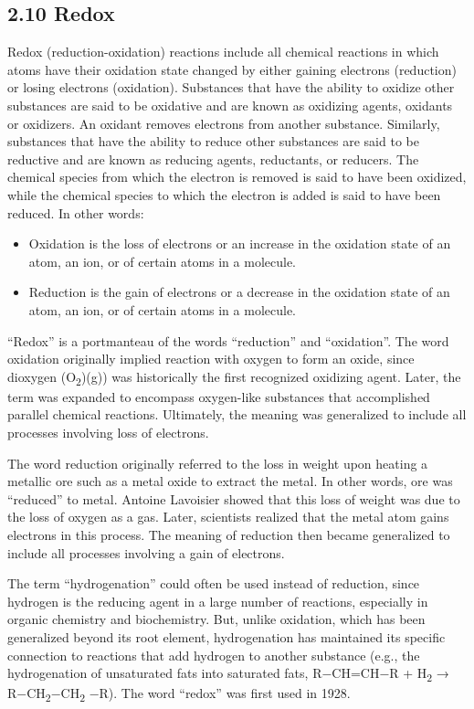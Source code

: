 \documentclass[
]{article}
\providecommand{\tightlist}{%
  \setlength{\itemsep}{0pt}\setlength{\parskip}{0pt}}
\providecommand{\tightlist}{%
  \setlength{\itemsep}{0pt}\setlength{\parskip}{0pt}}
\theoremstyle{definition}
\theoremstyle{definition}
\theoremstyle{definition}
\theoremstyle{remark}
\begin{document}
\hypertarget{redox}{%
\subsection{\texorpdfstring{{2.10} Redox}{2.10 Redox}}\label{redox}}

Redox (reduction-oxidation) reactions include all chemical reactions in
which atoms have their oxidation state changed by either gaining
electrons (reduction) or losing electrons (oxidation). Substances that
have the ability to oxidize other substances are said to be oxidative
and are known as oxidizing agents, oxidants or oxidizers. An oxidant
removes electrons from another substance. Similarly, substances that
have the ability to reduce other substances are said to be reductive and
are known as reducing agents, reductants, or reducers. The chemical
species from which the electron is removed is said to have been
oxidized, while the chemical species to which the electron is added is
said to have been reduced. In other words:

\begin{itemize}
\tightlist
\item
  Oxidation is the loss of electrons or an increase in the oxidation
  state of an atom, an ion, or of certain atoms in a molecule.
\item
  Reduction is the gain of electrons or a decrease in the oxidation
  state of an atom, an ion, or of certain atoms in a molecule.
\end{itemize}

``Redox'' is a portmanteau of the words ``reduction'' and ``oxidation''.
The word oxidation originally implied reaction with oxygen to form an
oxide, since dioxygen (O\textsubscript{2})(g)) was historically the
first recognized oxidizing agent. Later, the term was expanded to
encompass oxygen-like substances that accomplished parallel chemical
reactions. Ultimately, the meaning was generalized to include all
processes involving loss of electrons.

The word reduction originally referred to the loss in weight upon
heating a metallic ore such as a metal oxide to extract the metal. In
other words, ore was ``reduced'' to metal. Antoine Lavoisier showed that
this loss of weight was due to the loss of oxygen as a gas. Later,
scientists realized that the metal atom gains electrons in this process.
The meaning of reduction then became generalized to include all
processes involving a gain of electrons.

The term ``hydrogenation'' could often be used instead of reduction,
since hydrogen is the reducing agent in a large number of reactions,
especially in organic chemistry and biochemistry. But, unlike oxidation,
which has been generalized beyond its root element, hydrogenation has
maintained its specific connection to reactions that add hydrogen to
another substance (e.g., the hydrogenation of unsaturated fats into
saturated fats, R−CH=CH−R + H\textsubscript{2} →
R−CH\textsubscript{2}−CH\textsubscript{2} −R). The word ``redox'' was
first used in 1928.
\end{document}
